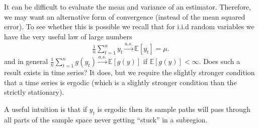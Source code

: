 
It can be difficult to evaluate the mean and variance of an estimator. Therefore, we may want
an alternative form of convergence (instead of the mean squared error). To see whether this is
possible we recall that for i.i.d random variables we have the very useful law of large numbers
\begin{gather*}
    \frac{1}{n} \sum_{t=1}^{n} y_t \xrightarrow{a.s.} \mathbb{E}[y_t] = \mu.
\end{gather*}
and in general $\frac{1}{n} \sum_{t=1}^{n} g(y_t) \xrightarrow{a.s.} \mathbb{E}[g(y)]$ if $\mathbb{E}[g(y)] < \infty$.
Does such a result exists in time series? 
It does, but we require the slightly stronger condition that a time series is ergodic 
(which is a slightly stronger condition than the strictly stationary).


A useful intuition is that if $y_t$ is ergodic then its sample paths will pass through all parts of the sample
space never getting ``stuck'' in a subregion. 



